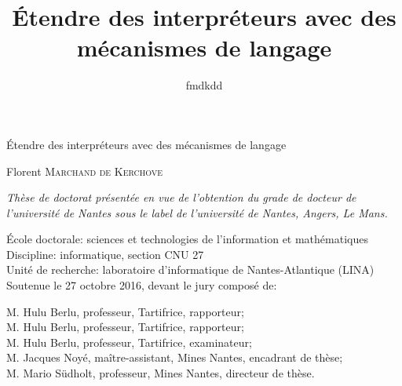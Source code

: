 

\newcommand{\titlefr}{Étendre des interpréteurs avec des mécanismes de langage}
\newcommand{\titleen}{Extending interpreters with language mechanisms}

\title{\titlefr}
\author{fmdkdd}




\frontmatter

\begin{titlepage}
\sffamily
\vspace{6cm}

\begin{raggedright}
\Huge\titlefr
\end{raggedright}

\vspace{1.5cm}

\LARGE
\noindent
Florent \textsc{Marchand de Kerchove}

\vfill

\begin{raggedright}
\it
\normalsize
Thèse de doctorat présentée en vue de l'obtention du
grade de docteur de l'université de Nantes
sous le label de l'université de Nantes, Angers, Le Mans.

\vspace{1em}
École doctorale: sciences et technologies de l'information et mathématiques\\
Discipline: informatique, section CNU 27\\
Unité de recherche: laboratoire d'informatique de Nantes-Atlantique (LINA)\\

\vspace{1em}
Soutenue le 27 octobre 2016, devant le jury composé de:

\vspace{0.5em}
M. Hulu Berlu, professeur, Tartifrice, rapporteur;\\
M. Hulu Berlu, professeur, Tartifrice, rapporteur;\\
M. Hulu Berlu, professeur, Tartifrice, examinateur;\\
M. Jacques Noyé, maître-assistant, Mines Nantes, encadrant de thèse;\\
M. Mario Südholt, professeur, Mines Nantes, directeur de thèse.\\
\vspace{-2cm}
\end{raggedright}
\end{titlepage}

